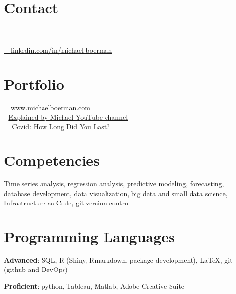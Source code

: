 \documentclass[margin, line]{res}
\begin{document}
\address{Summary: Quantitative M.S. with 2+ YOE in Data Science Analytics; speciality in forecasting and automation with R.}

\begin{resume}

\section{\sc Contact}

 \\
 \\
\faLinkedinIn  \href{https://www.linkedin.com/in/michael-boerman}{\ttfamily \, \, linkedin.com/in/michael-boerman}\\
\vspace{-.35cm}


\section{\sc Portfolio}
\faBriefcase \, \href{https://www.michaelboerman.com/}{\ttfamily  \, www.michaelboerman.com}\\
 \,\, \href{https://www.youtube.com/channel/UCxFMrMb6PrS7SOrQi-BfMUw/videos?view=0&sort=p&flow=grid}{ Explained by Michael YouTube channel}\\
\faChartLine \,\, \href{https://michaelboerman.shinyapps.io/covid_percentiles/}{\, Covid: How Long Did You Last?}\\
\vspace{-.35cm}

\section{\sc Competencies} 
Time series analysis, regression analysis, predictive modeling, forecasting, database development, data visualization, big data and small data science, Infrastructure as Code, git version control

\section{\sc Programming Languages} 
{\bf Advanced}:  SQL, R (Shiny, Rmarkdown, package development), \LaTeX, git (github and DevOps)
\vspace*{-3mm}

{\bf Proficient}: python, Tableau, Matlab, Adobe Creative Suite



\end{resume}
\end{document}
